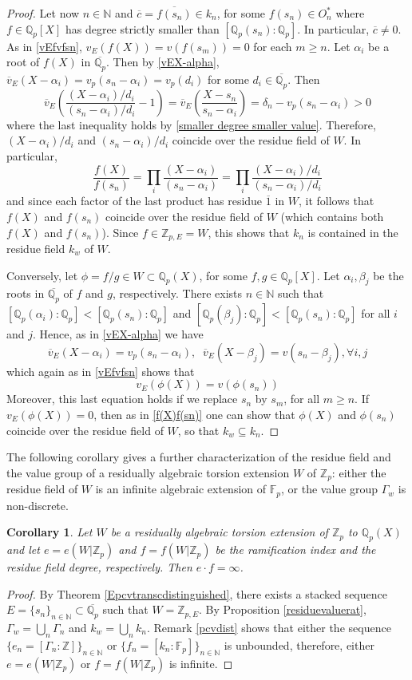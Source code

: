 \documentclass[10pt]{article}
\numberwithin{equation}{section}
\newtheorem{Cor}[equation]{Corollary}
\theoremstyle{definition}\newtheorem{Def}[equation]{Definition}
\theoremstyle{definition}\newtheorem{Ques}[equation]{Question}
\newcommand{\F}{\mathbb{F}}
\newcommand{\Q}{\mathbb{Q}}
\newcommand{\N}{\mathbb{N}}
\newcommand{\Z}{\mathbb{Z}}
\newcommand{\oQp}{\overline{\Q_p}}
\begin{document}
\begin{proof}
Let now $n\in\N$ and $\overline{c}=\overline{f(s_n)}\in k_n$, for some $f(s_n)\in O_n^*$ where $f\in \Q_p[X]$ has degree strictly smaller than $[\Q_p(s_n):\Q_p]$. In particular, $\overline{c}\not=0$. As in \eqref{vEfvfsn}, $v_E(f(X))=v(f(s_m))=0$ for each $m\geq n$. Let $\alpha_i$ be a root of $f(X)$ in $\oQp$. Then by \eqref{vEX-alpha}, $\overline v_E(X-\alpha_i)=v_p(s_n-\alpha_i)=v_p(d_i)$ for some $d_i\in\oQp$. Then
$$\overline v_E\left(\frac{(X-\alpha_i)/d_i}{(s_n-\alpha_i)/d_i}-1\right)=\overline v_E\left(\frac{X-s_n}{s_n-\alpha_i}\right)=\delta_n-v_p(s_n-\alpha_i)>0$$
where the last inequality holds by \eqref{smaller degree smaller value}. Therefore, $(X-\alpha_i)/d_i$ and $(s_n-\alpha_i)/d_i$ coincide over the residue field of $W$. In particular,
\begin{equation}\label{f(X)f(sn)}
\frac{f(X)}{f(s_n)}=\prod_i\frac{(X-\alpha_i)}{(s_n-\alpha_i)}=\prod_i\frac{(X-\alpha_i)/d_i}{(s_n-\alpha_i)/d_i}
\end{equation}
and since each factor of the last product has residue $\overline 1$ in $W$, it follows that $f(X)$ and $f(s_n)$ coincide over the  residue field of $W$ (which contains both $f(X)$ and $f(s_n)$). Since $f\in\Z_{p,E}=W$, this shows that $k_n$ is contained in the residue field $k_w$ of $W$.

Conversely, let $\phi=f/g\in W\subset\Q_p(X)$, for some $f,g\in\Q_p[X]$. Let $\alpha_i,\beta_j$ be the roots in $\oQp$ of $f$ and $g$, respectively. There exists $n\in\N$ such that $[\Q_p(\alpha_i):\Q_p]<[\Q_p(s_n):\Q_p]$ and $[\Q_p(\beta_j):\Q_p]<[\Q_p(s_n):\Q_p]$ for all $i$ and $j$. Hence, as in \eqref{vEX-alpha} we have 
$$\overline v_E(X-\alpha_i)=v_p(s_n-\alpha_i),\;\;\overline v_E(X-\beta_j)=v(s_n-\beta_j),\forall i,j$$
which again as in \eqref{vEfvfsn} shows that
$$v_E(\phi(X))=v(\phi(s_n))$$
Moreover, this last equation holds if we replace $s_n$ by $s_m$, for all $m\geq n$. If $v_E(\phi(X))=0$, then as in \eqref{f(X)f(sn)} one can show that $\phi(X)$ and $\phi(s_n)$ coincide over the residue field of $W$, so that $k_w\subseteq k_n$.
\end{proof}
The following corollary gives a further characterization of the residue field and the value group of a residually algebraic torsion extension $W$ of $\Z_p$: either the residue field of $W$ is an infinite algebraic extension of $\F_p$, or the value group $\Gamma_w$ is non-discrete.
\begin{Cor}\label{eof infinite}
Let $W$ be a residually algebraic torsion extension of $\Z_p$ to $\Q_p(X)$ and let $e=e(W|\Z_p)$ and $f=f(W|\Z_p)$ be the ramification index and the residue field degree, respectively.  Then $e\cdot f=\infty$.
\end{Cor}
\begin{proof}
By Theorem \ref{Epcvtranscdistinguished}, there exists a stacked sequence $E=\{s_n\}_{n\in\N}\subset\oQp$ such that $W=\Z_{p,E}$. By Proposition \ref{residuevaluerat}, $\Gamma_w=\bigcup_n \Gamma_n$ and $k_w=\bigcup_n k_n$. Remark \ref{pcvdist} shows that either the sequence $\{e_n=[\Gamma_n:\Z]\}_{n\in\N}$ or $\{f_n=[k_n:\F_p]\}_{n\in\N}$ is unbounded, therefore, either $e=e(W|\Z_p)$ or $f=f(W|\Z_p)$ is infinite.
\end{proof}
\end{document}
